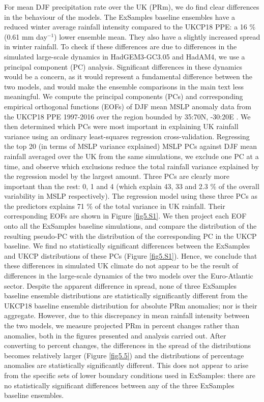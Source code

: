     For mean DJF precipitation rate over the UK (PRm), we do find clear differences in the behaviour of the models. The ExSamples baseline ensembles have a reduced winter average rainfall intensity compared to the UKCP18 PPE: a 16 \% (0.61 mm day$^{-1}$) lower ensemble mean. They also have a slightly increased spread in winter rainfall. To check if these differences are due to differences in the simulated large-scale dynamics in HadGEM3-GC3.05 and HadAM4, we use a principal component (PC) analysis. Significant differences in these dynamics would be a concern, as it would represent a fundamental difference between the two models, and would make the ensemble comparisons in the main text less meaningful. We compute the principal components (PCs) and corresponding empirical orthogonal functions (EOFs) of DJF mean MSLP anomaly data from the UKCP18 PPE 1997-2016 over the region bounded by 35:70N, -30:20E \citep{neal_flexible_2016}. We then determined which PCs were most important in explaining UK rainfall variance using an ordinary least-squares regression cross-validation. Regressing the top 20 (in terms of MSLP variance explained) MSLP PCs against DJF mean rainfall averaged over the UK from the same simulations, we exclude one PC at a time, and observe which exclusions reduce the total rainfall variance explained by the regression model by the largest amount. Three PCs are clearly more important than the rest: 0, 1 and 4 (which explain 43, 33 and 2.3 \% of the overall variability in MSLP respectively). The regression model using these three PCs as the predictors explains 71 \% of the total variance in UK rainfall. Their corresponding EOFs are shown in Figure \ref{fig5.S1}. We then project each EOF onto all the ExSamples baseline simulations, and compare the distribution of the resulting pseudo-PC with the distribution of the corresponding PC in the UKCP baseline. We find no statistically significant differences between the ExSamples and UKCP distributions of these PCs (Figure \ref{fig5.S1}). Hence, we conclude that these differences in simulated UK climate do not appear to be the result of differences in the large-scale dynamics of the two models over the Euro-Atlantic sector. Despite the apparent difference in spread, none of three ExSamples baseline ensemble distributions are statistically significantly different from the UKCP18 baseline ensemble distribution for absolute PRm anomalies; nor is their aggregate. However, due to this discrepancy in mean rainfall intensity between the two models, we measure projected PRm in percent changes rather than anomalies, both in the figures presented and analysis carried out. After converting to percent changes, the differences in the spread of the distributions becomes relatively larger (Figure \ref{fig5.5}) and the distributions of percentage anomalies are statistically significantly different. This does not appear to arise from the specific sets of lower boundary conditions used in ExSamples: there are no statistically significant differences between any of the three ExSamples baseline ensembles.
     
